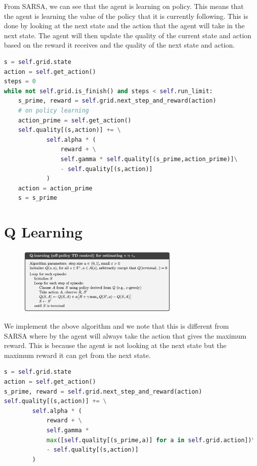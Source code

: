\documentclass{article}
\begin{document}
From SARSA, we can see that the agent is learning on policy. This means that the
agent is learning the value of the policy that it is currently following. This
is done by looking at the next state and the action that the agent will take in
the next state. The agent will then update the quality of the current state and
action based on the reward it receives and the quality of the next state and
action.

\begin{lstlisting}[language=Python, caption=SARSA code]
s = self.grid.state
action = self.get_action()
steps = 0
while not self.grid.is_finish() and steps < self.run_limit:
    s_prime, reward = self.grid.next_step_and_reward(action)
    # on policy learning
    action_prime = self.get_action()
    self.quality[(s,action)] += \
            self.alpha * (
                reward + \
                self.gamma * self.quality[(s_prime,action_prime)]\
                - self.quality[(s,action)]
            )
    action = action_prime
    s = s_prime
\end{lstlisting}

\section*{Q Learning}

\begin{figure}[h]
    \centering
    \includegraphics[width=0.7\textwidth]{image-2.png}
\end{figure}

We implement the above algorithm and we note that this is different from
SARSA where by the agent will always take the action that gives the maximum
reward. This is because the agent is not looking at the next state but the
maximum reward it can get from the next state.

\begin{lstlisting}[language=Python, caption=Qlearning code]
s = self.grid.state
action = self.get_action()
s_prime, reward = self.grid.next_step_and_reward(action)
self.quality[(s,action)] += \
        self.alpha * (
            reward + \
            self.gamma *
            max([self.quality[(s_prime,a)] for a in self.grid.action])\
            - self.quality[(s,action)]
        )
\end{lstlisting}
\end{document}
